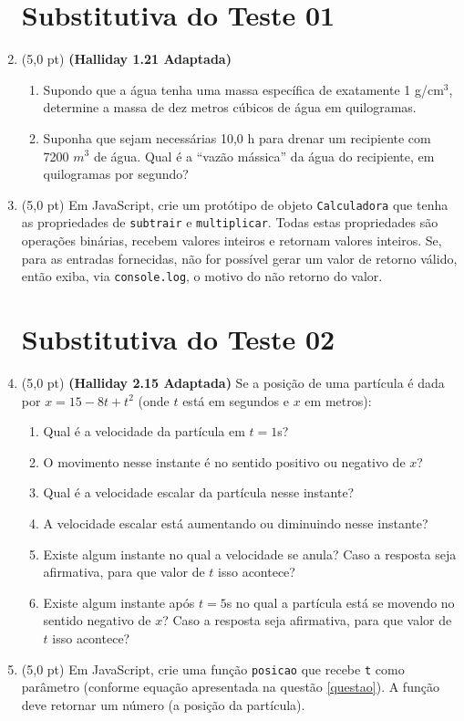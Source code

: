 \documentclass[12pt,a4paper,oneside]{article}
\begin{document}
\begin{enumerate}
	
	\section*{Substitutiva do Teste 01}

\item (5,0 pt) {\bf (Halliday 1.21 Adaptada)} 
\begin{enumerate}
	\item Supondo que a água tenha uma massa específica de exatamente 1 g/$\mbox{cm}^3$, determine a massa de dez metros cúbicos de água em quilogramas.
	\item Suponha que sejam necessárias 10,0 h para drenar um recipiente com 7200 $m^3$ de água. Qual é a ``vazão mássica'' da água do recipiente, em quilogramas por segundo?
\end{enumerate}		 
	
	
	\item (5,0 pt) Em JavaScript, crie um protótipo de objeto {\tt Calculadora} que tenha as propriedades de {\tt subtrair} e {\tt multiplicar}. Todas estas propriedades são operações binárias, recebem valores inteiros e retornam valores inteiros. Se, para as entradas fornecidas, não for possível gerar um valor de retorno válido, então exiba, via {\tt console.log}, o motivo do não retorno do valor.
	
	\section*{Substitutiva do Teste 02}
	
	\item (5,0 pt) {\bf (Halliday 2.15 Adaptada)} Se a posição de uma partícula é dada por $x = 15 -8t  + t^2$ (onde $t$ está em segundos e $x$ em metros): \label{questao}
	\begin{enumerate}
		\item Qual é a velocidade da partícula em $t = 1$s? 
		\item O movimento nesse instante é no sentido positivo ou negativo de $x$? 
		\item Qual é a velocidade escalar da partícula nesse instante?
		\item A velocidade escalar está aumentando	ou diminuindo nesse instante?
		\item Existe algum instante no 	qual a velocidade se anula? Caso a resposta seja afirmativa, para que valor de $t$ isso acontece? 
		\item Existe algum instante após  $t  = 5$s	no qual a partícula está se movendo no sentido negativo de $x$?  Caso a resposta seja afirmativa, para que valor de $t$ isso acontece?
	\end{enumerate}

	\item (5,0 pt) Em JavaScript, crie uma função {\tt posicao} que recebe {\tt t} como parâmetro (conforme equação apresentada na questão \ref{questao}). A função deve retornar um número (a posição da partícula).
	
	\end{enumerate}
\end{document}

